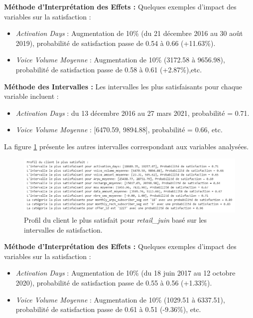 \textbf{Méthode d'Interprétation des Effets :}
Quelques exemples d'impact des variables sur la satisfaction :
\begin{itemize}
    \item \textit{Activation Days} : Augmentation de 10\% (du 21 décembre 2016 au 30 août 2019), probabilité de satisfaction passe de 0.54 à 0.66 (+11.63\%).
    \item \textit{Voice Volume Moyenne} : Augmentation de 10\% (3172.58 à 9656.98), probabilité de satisfaction passe de 0.58 à 0.61 (+2.87\%),etc.
\end{itemize}

\textbf{Méthode des Intervalles :}  
Les intervalles les plus satisfaisants pour chaque variable incluent :  
\begin{itemize}
    \item \textit{Activation Days} : du 13 décembre 2016 au 27 mars 2021, probabilité = 0.71.
    \item \textit{Voice Volume Moyenne} : [6470.59, 9894.88], probabilité = 0.66, etc.
\end{itemize}
La figure \ref{fig:profil_satisfait_retail} présente les autres intervalles correspondant aux variables analysées.

\begin{figure}[H]
    \centering
    \includegraphics[width=0.9\linewidth]{capture_modele_34.png}
    \caption{Profil du client le plus satisfait pour \textit{retail\_juin} basé sur les intervalles de satisfaction.}
    \label{fig:profil_satisfait_retail}
\end{figure}

\textbf{Méthode d'Interprétation des Effets :}  
Quelques exemples d'impact des variables sur la satisfaction :  
\begin{itemize}
    \item \textit{Activation Days} : Augmentation de 10\% (du 18 juin 2017 au 12 octobre 2020), probabilité de satisfaction passe de 0.55 à 0.56 (+1.33\%).
    \item \textit{Voice Volume Moyenne} : Augmentation de 10\% (1029.51 à 6337.51), probabilité de satisfaction passe de 0.61 à 0.51 (-9.36\%), etc.
\end{itemize}

